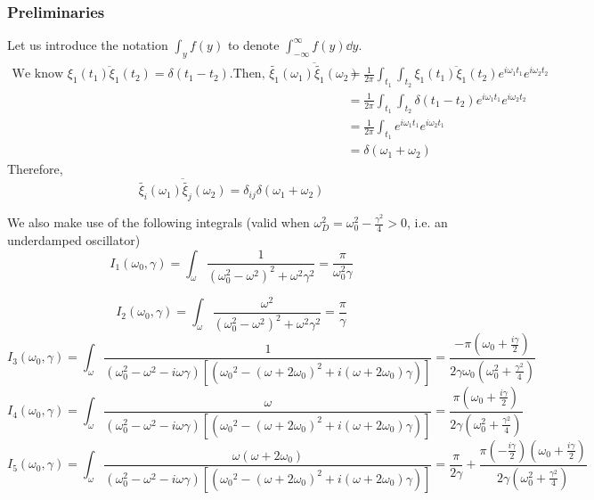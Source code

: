 \documentclass[12pt, twoside]{article}
\begin{document}
\subsubsection{Preliminaries}
Let us introduce the notation $\int_{y}^{} f(y)$ to denote $\int_{-\infty}^{\infty} f(y) \dd{y}$. \\
$\begin{aligned}\text{We know } \overline{\xi_1(t_1)\xi_1(t_2)} = \delta(t_1 - t_2). \text{Then, } \overline{\widetilde{\xi_1}(\omega_1)\widetilde{\xi_1}(\omega_2)} &= \frac{1}{2\pi}\int_{t_1}\int_{t_2} \overline{\xi_1(t_1)\xi_1(t_2)} e^{i\omega_1 t_1}e^{i\omega_2 t_2} \\&= \frac{1}{2\pi}\int_{t_1}\int_{t_2} \delta(t_1-t_2) e^{i\omega_1 t_1}e^{i\omega_2 t_2} \\&= \frac{1}{2\pi}\int_{t_1} e^{i\omega_1 t_1} e^{i\omega_2 t_1} \\&= \delta(\omega_1 + \omega_2)\end{aligned}$\\
Therefore, \begin{equation}
	\overline{\widetilde{\xi_i}(\omega_1)\widetilde{\xi_j}(\omega_2)} = \delta_{ij}\delta(\omega_1 + \omega_2)
\end{equation}

We also make use of the following integrals (valid when $\omega_D ^2 = \omega_0^2 - \frac{\gamma^2}{4} > 0$, i.e. an underdamped oscillator)
\begin{equation}
	I_1(\omega_0,\gamma) = \int_{\omega} \frac{1}{(\omega_0^2 - \omega^2)^2 + \omega^2 \gamma^2} = \frac{\pi}{\omega_0^2 \gamma}
\end{equation}

\begin{equation}
I_2(\omega_0,\gamma) = \int_{\omega} \frac{\omega^2}{(\omega_0^2 - \omega^2)^2 + \omega^2 \gamma^2} = \frac{\pi}{\gamma}
\end{equation} 
\begin{equation}
I_3(\omega_0,\gamma) = \int_{\omega} \frac{1}{(\omega_0^2 - \omega^2 - i\omega\gamma) [({\omega_0}^2 - (\omega + 2\omega_0)^2 + i(\omega + 2 \omega_0) \gamma)]} = \frac{-\pi(\omega_0 + \frac{i\gamma}{2})}{2\gamma\omega_0(\omega_0^2 + \frac{\gamma^2}{4})}
\end{equation}
\begin{equation}
I_4(\omega_0,\gamma) = \int_{\omega} \frac{\omega}{(\omega_0^2 - \omega^2 - i\omega\gamma) [({\omega_0}^2 - (\omega + 2\omega_0)^2 + i(\omega + 2 \omega_0) \gamma)]} = \frac{\pi(\omega_0 + \frac{i\gamma}{2})}{2\gamma(\omega_0^2 + \frac{\gamma^2}{4})}
\end{equation}
\begin{equation}
I_5(\omega_0,\gamma) = \int_{\omega} \frac{\omega (\omega + 2\omega_0)}{(\omega_0^2 - \omega^2 - i\omega\gamma) [({\omega_0}^2 - (\omega + 2\omega_0)^2 + i(\omega + 2 \omega_0) \gamma)]} = \frac{\pi}{2\gamma} + \frac{\pi(-\frac{i\gamma}{2})(\omega_0 + \frac{i\gamma}{2})}{2\gamma(\omega_0^2 + \frac{\gamma^2}{4})}
\end{equation}
\end{document}
